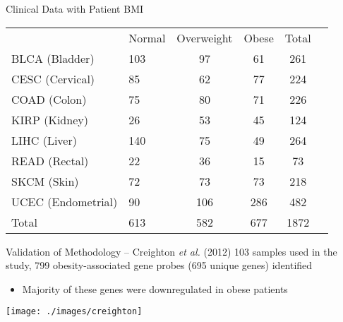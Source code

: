 \documentclass[handout]{beamer}
\begin{document}
\begin{frame}{Clinical Data with Patient BMI}
	\begin{adjustwidth}{-1.5em}{-1.5em}
		\begin{center}
			\begin{tabular}{llcccl}
				& Normal & Overweight & Obese & Total\\
				\rowcolor{LightCyan}
				BLCA (Bladder)        & 103 & 97  & 61  & 261\\
				CESC (Cervical)       & 85  & 62  & 77  & 224   \\
				\rowcolor{LightCyan}
				COAD (Colon)          & 75  & 80  & 71  & 226   \\
				KIRP (Kidney)         & 26  & 53  & 45  & 124\\
				\rowcolor{LightCyan}
				LIHC (Liver)          & 140 & 75  & 49  & 264\\
				READ (Rectal)         & 22  & 36  & 15  & 73\\
				\rowcolor{LightCyan}
				SKCM (Skin)           & 72  & 73  & 73  & 218\\
				UCEC (Endometrial)    & 90  & 106 & 286 & 482\\
				\hline
				\rule{0pt}{2.25ex}Total & 613 & 582 & 677 & 1872\\
			\end{tabular}
		\end{center}
	\end{adjustwidth}
\end{frame}

\begin{frame}{Validation of Methodology -- Creighton \textit{et al.} (2012)}
	103 samples used in the study, 799 obesity-associated gene probes (695 unique genes) identified\\
	{\footnotesize
		\begin{itemize}
			\item Majority of these genes were downregulated in obese patients
		\end{itemize}
	}
	\begin{center}
		\texttt{[image: ./images/creighton]}
	\end{center}
\end{frame}

\end{document}
